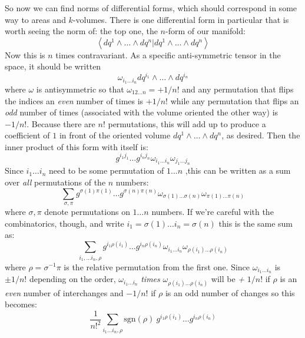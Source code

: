 	So now we can find norms of differential forms, which should correspond in some way to areas and $k$-volumes. There is one differential form in particular that is worth seeing the norm of: the top one, the $n$-form of our manifold:
	\begin{equation}
		\left< dq^1 \wedge \dots \wedge dq^n | dq^1 \wedge \dots \wedge dq^n \right>
	\end{equation}
	Now this is $n$ times contravariant. As a specific anti-symmetric tensor in the space, it should be written
	\begin{equation}
		\omega_{i_1\dots i_n} dq^{i_1} \wedge \dots \wedge dq^{i_n}
	\end{equation}
	where $\omega$ is antisymmetric so that $\omega_{12\dots n} = +1/n!$ and any permutation that flips the indices an \emph{even} number of times is $+1/n!$ while any permutation that flips an \emph{odd} number of times (associated with the volume oriented the other way) is $-1/n!$. Because there are $n!$ permutations, this will add up to produce a coefficient of $1$ in front of the oriented volume $dq^1 \wedge \dots \wedge dq^n$, as desired. Then the inner product of this form with itself is:
	\begin{equation}
		g^{i_1 j_1} \dots g^{i_n j_n} \omega_{i_1 \dots i_n} \omega_{j_1 \dots j_n}
	\end{equation}
	Since $i_1 \dots i_n$ need to be some permutation of $1 \dots n$ ,this can be written as a sum over \emph{all} permutations of the $n$ numbers:
	\begin{equation}
		\sum_{\sigma, \pi} g^{\sigma(1) \pi(1)} \dots g^{\sigma(n) \pi(n)} \omega_{\sigma(1) \dots \sigma(n)}  \omega_{\pi(1) \dots \pi(n)}
	\end{equation}
	where $\sigma, \pi$ denote permutations on $1 \dots n$ numbers. If we're careful with the combinatorics, though, and write $i_1=\sigma(1) \dots i_n = \sigma(n)$ this is the same sum as:
	\begin{equation}
		\sum_{i_1, \dots i_n, \rho} g^{i_1 \rho(i_1)} \dots g^{i_n \rho(i_n)} \omega_{i_1 \dots i_n} \omega_{\rho(i_1) \dots \rho(i_n)}
	\end{equation}
	where $\rho = \sigma^{-1} \pi$ is the relative permutation from the first one. Since $\omega_{i_1 \dots i_n}$ is $\pm 1/n!$ depending on the order, $\omega_{i_1 \dots i_n}$ \emph{times} $\omega_{\rho(i_1) \dots \rho(i_n)}$ will be \emph{+} $1/n!$ if $\rho$ is an \emph{even} number of interchanges and $-1/n!$ if $\rho$ is an odd number of changes so this becomes:
	\begin{equation}
		\frac{1}{n!^2} \sum_{i_1 \dots i_n, \rho}  \text{sgn}(\rho) ~ g^{i_1 \rho(i_1)} \dots g^{i_n \rho(i_n)}
	\end{equation}
